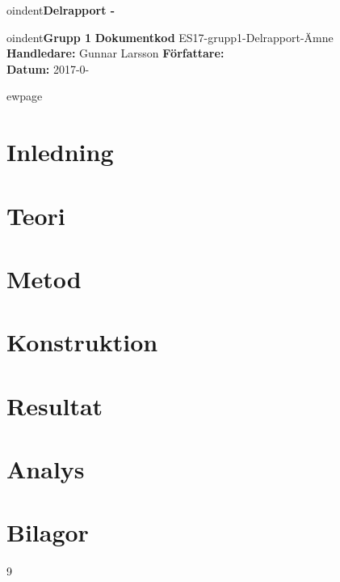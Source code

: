 \documentclass[a4paper, 11pt]{article}
\begin{document}

oindent{\LARGE {\bf Delrapport - }}  \\
\vspace{1cm} 




oindent\textbf{Grupp 1} \hfill \textbf{Dokumentkod} ES17-grupp1-Delrapport-Ämne  
\hfill \\
\textbf{Handledare:} Gunnar Larsson
\hfill \textbf{Författare:}   \\ 
\hfill \textbf{Datum:} 2017-0- \\
\vspace{3cm} 

\begin{abstract}

\end{abstract}

ewpage
\section*{Inledning}


\section*{Teori}


\section*{Metod}


\section*{Konstruktion}

\section*{Resultat}

\section*{Analys}

\section*{Bilagor}

\begin{thebibliography}{9}

\end{thebibliography}
\end{document}

